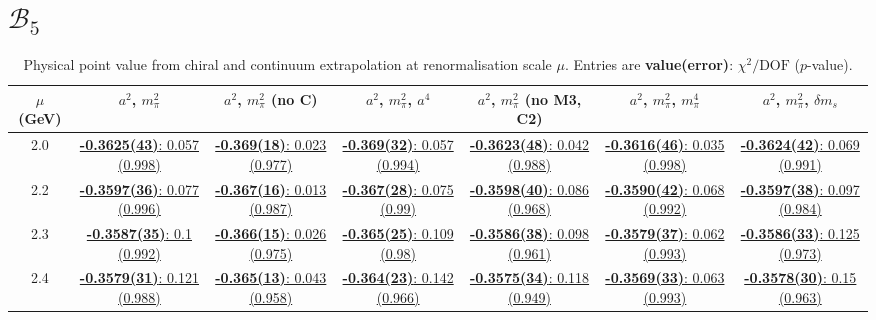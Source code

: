 \documentclass[12pt]{extarticle}
\begin{document}
\section{$\mathcal{B}_5$}
\begin{table}[h!]
\begin{center}
\begin{tabular}{|c|c|c|c|c|c|c|}
\hline
$\mu$ (GeV) & $a^2$, $m_\pi^2$& $a^2$, $m_\pi^2$ (no C)& $a^2$, $m_\pi^2$, $a^4$& $a^2$, $m_\pi^2$ (no M3, C2)& $a^2$, $m_\pi^2$, $m_\pi^4$& $a^2$, $m_\pi^2$, $\delta m_s$\\
\hline
2.0& \hyperlink{TT/NPR/bag_a2m2_20.pdf.1}{\textbf{-0.3625(43)}: 0.057 (0.998)} & \hyperlink{TT/NPR/bag_a2m2noC_20.pdf.1}{\textbf{-0.369(18)}: 0.023 (0.977)} & \hyperlink{TT/NPR/bag_a2a4m2_20.pdf.1}{\textbf{-0.369(32)}: 0.057 (0.994)} & \hyperlink{TT/NPR/bag_a2m2mcut_20.pdf.1}{\textbf{-0.3623(48)}: 0.042 (0.988)} & \hyperlink{TT/NPR/bag_a2m2m4_20.pdf.1}{\textbf{-0.3616(46)}: 0.035 (0.998)} & \hyperlink{TT/NPR/bag_a2m2delm_20.pdf.1}{\textbf{-0.3624(42)}: 0.069 (0.991)}\\
2.2& \hyperlink{TT/NPR/bag_a2m2_22.pdf.1}{\textbf{-0.3597(36)}: 0.077 (0.996)} & \hyperlink{TT/NPR/bag_a2m2noC_22.pdf.1}{\textbf{-0.367(16)}: 0.013 (0.987)} & \hyperlink{TT/NPR/bag_a2a4m2_22.pdf.1}{\textbf{-0.367(28)}: 0.075 (0.99)} & \hyperlink{TT/NPR/bag_a2m2mcut_22.pdf.1}{\textbf{-0.3598(40)}: 0.086 (0.968)} & \hyperlink{TT/NPR/bag_a2m2m4_22.pdf.1}{\textbf{-0.3590(42)}: 0.068 (0.992)} & \hyperlink{TT/NPR/bag_a2m2delm_22.pdf.1}{\textbf{-0.3597(38)}: 0.097 (0.984)}\\
2.3& \hyperlink{TT/NPR/bag_a2m2_23.pdf.1}{\textbf{-0.3587(35)}: 0.1 (0.992)} & \hyperlink{TT/NPR/bag_a2m2noC_23.pdf.1}{\textbf{-0.366(15)}: 0.026 (0.975)} & \hyperlink{TT/NPR/bag_a2a4m2_23.pdf.1}{\textbf{-0.365(25)}: 0.109 (0.98)} & \hyperlink{TT/NPR/bag_a2m2mcut_23.pdf.1}{\textbf{-0.3586(38)}: 0.098 (0.961)} & \hyperlink{TT/NPR/bag_a2m2m4_23.pdf.1}{\textbf{-0.3579(37)}: 0.062 (0.993)} & \hyperlink{TT/NPR/bag_a2m2delm_23.pdf.1}{\textbf{-0.3586(33)}: 0.125 (0.973)}\\
2.4& \hyperlink{TT/NPR/bag_a2m2_24.pdf.1}{\textbf{-0.3579(31)}: 0.121 (0.988)} & \hyperlink{TT/NPR/bag_a2m2noC_24.pdf.1}{\textbf{-0.365(13)}: 0.043 (0.958)} & \hyperlink{TT/NPR/bag_a2a4m2_24.pdf.1}{\textbf{-0.364(23)}: 0.142 (0.966)} & \hyperlink{TT/NPR/bag_a2m2mcut_24.pdf.1}{\textbf{-0.3575(34)}: 0.118 (0.949)} & \hyperlink{TT/NPR/bag_a2m2m4_24.pdf.1}{\textbf{-0.3569(33)}: 0.063 (0.993)} & \hyperlink{TT/NPR/bag_a2m2delm_24.pdf.1}{\textbf{-0.3578(30)}: 0.15 (0.963)}\\
\hline
\end{tabular}
\caption{Physical point value from chiral and continuum extrapolation at renormalisation scale $\mu$. Entries are \textbf{value(error)}: $\chi^2/\text{DOF}$ ($p$-value).}
\end{center}
\end{table}
\end{document}
